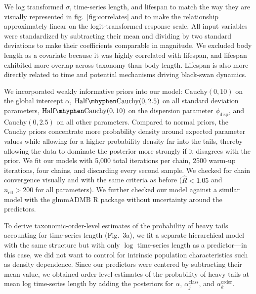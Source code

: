 \documentclass[12pt]{article}
\begin{document}
We log transformed \(\sigma\), time-series length, and lifespan to match the way they are visually represented in fig.~\ref{fig:correlates} and to make the relationship approximately linear on the logit-transformed response scale. All input variables were standardized by subtracting their mean and dividing by two standard deviations to make their coefficients comparable in magnitude\cite{gelman2008c}. We excluded body length as a covariate because it was highly correlated with lifespan, and lifespan exhibited more overlap across taxonomy than body length. Lifespan is also more directly related to time and potential mechanisms driving black-swan dynamics.

We incorporated weakly informative priors into our model: \(\mathrm{Cauchy}(0, 10)\) on the global intercept \(\alpha\), \(\mathrm{Half\mhyphen Cauchy}(0, 2.5)\) on all standard deviation parameters, \(\mathrm{Half\mhyphen Cauchy}(0, 10)\) on the dispersion parameter \(\phi_\mathrm{disp}\), and \(\mathrm{Cauchy}(0, 2.5)\) on all other parameters\cite{gelman2006c, gelman2008d}. Compared to normal priors, the Cauchy priors concentrate more probability density around expected parameter values while allowing for a higher probability density far into the tails, thereby allowing the data to dominate the posterior more strongly if it disagrees with the prior. We fit our models with 5,000 total iterations per chain, 2500 warm-up iterations, four chains, and discarding every second sample. We checked for chain convergence visually and with the same criteria as before (\(\widehat{R} < 1.05\) and \(n_\mathrm{eff} >200\) for all parameters). We further checked our model against a similar model with the glmmADMB \textsf{R} package\cite{glmmadmb} without uncertainty around the predictors.

To derive taxonomic-order-level estimates of the probability of heavy tails accounting for time-series length (Fig.~3a), we fit a separate hierarchical model with the same structure but with only \(\log\) time-series length as a predictor---in this case, we did not want to control for intrinsic population characteristics such as density dependence. Since our predictors were centered by subtracting their mean value, we obtained order-level estimates of the probability of heavy tails at mean log time-series length by adding the posteriors for \(\alpha\), \(\alpha^\mathrm{class}_j\), and \(\alpha^\mathrm{order}_k\).
\end{document}
